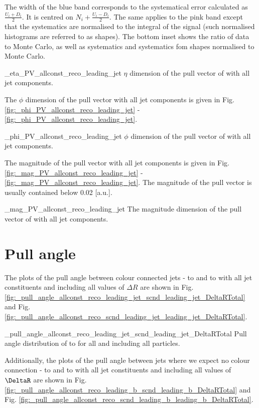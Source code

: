 The width of the blue band corresponds to the systematical error calculated as $\frac{U_{i}+D_{i}}{2}$. It is centred on $N_{i} + \frac{U_{i}-D_{i}}{2}$. The same applies to the pink band except that the systematics are normalised to the integral of the signal (such normalised histograms are referred to as shapes). The bottom inset shows the ratio of data to Monte Carlo, as well as systematics and systematics fom shapes normalised to Monte Carlo.

          {_eta_PV_allconst_reco_leading_jet}
          {$\eta$ dimension of the pull vector of \leadingjet with all jet components.}

The $\phi$ dimension of the pull vector with all jet components is given in Fig. \ref{fig:_phi_PV_allconst_reco_leading_jet} - \ref{fig:_phi_PV_allconst_reco_leading_jet}. 

          {_phi_PV_allconst_reco_leading_jet}
          {$\phi$ dimension of the pull vector of \leadingjet with all jet components.}

The magnitude of the pull vector with all jet components is given in Fig. \ref{fig:_mag_PV_allconst_reco_leading_jet} - \ref{fig:_mag_PV_allconst_reco_leading_jet}. The magnitude of the pull vector is usually contained below 0.02 [a.u.].

          {_mag_PV_allconst_reco_leading_jet}
          {The magnitude dimension of the pull vector of \leadingjet with all jet components.}

\section{Pull angle}

The plots of the pull angle between colour connected jets - \leadingjet to \scndleadingjet and \scndleadingjet to \leadingjet with all jet constituents and including all values of $\Delta R$ are shown in Fig. \ref{fig:_pull_angle_allconst_reco_leading_jet_scnd_leading_jet_DeltaRTotal} and Fig. \ref{fig:_pull_angle_allconst_reco_scnd_leading_jet_leading_jet_DeltaRTotal}.

          {_pull_angle_allconst_reco_leading_jet_scnd_leading_jet_DeltaRTotal}
          {Pull angle distribution of \leadingjet to \scndleadingjet for all \DeltaR and including all particles.}


Additionally, the plots of the pull angle between jets where we expect no colour connection - \leadingb to \scndleadingb and \scndleadingb to \leadingb with all jet constituents and including all values of $\DeltaR $ are shown in Fig. \ref{fig:_pull_angle_allconst_reco_leading_b_scnd_leading_b_DeltaRTotal} and Fig. \ref{fig:_pull_angle_allconst_reco_scnd_leading_b_leading_b_DeltaRTotal}.

